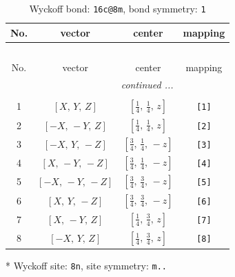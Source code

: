 \documentclass[fleqn,8pt]{jsarticle}
\begin{document}
\renewcommand{\arraystretch}{1.2}
\begin{longtable}{cccc}
\caption{Wyckoff bond: {\tt 16c@8m}, bond symmetry: {\tt 1}}
 \\
 \hline \hline
No. & vector & center & mapping \\ \hline \endfirsthead

\multicolumn{3}{l}{\tablename\ \thetable{}} \\
 \hline \hline
No. & vector & center & mapping \\ \hline \endhead

 \hline \hline
\multicolumn{3}{r}{\footnotesize\it continued ...} \\ \endfoot

 \hline \hline
\multicolumn{3}{r}{} \\ \endlastfoot

1 & $\left[ X,\, Y,\, Z \right]$ & $\left[ \frac{1}{4},\, \frac{1}{4},\, z \right]$ & {\tt [1]} \\ \hline
2 & $\left[ - X,\, - Y,\, Z \right]$ & $\left[ \frac{1}{4},\, \frac{1}{4},\, z \right]$ & {\tt [2]} \\ \hline
3 & $\left[ - X,\, Y,\, - Z \right]$ & $\left[ \frac{3}{4},\, \frac{1}{4},\, - z \right]$ & {\tt [3]} \\ \hline
4 & $\left[ X,\, - Y,\, - Z \right]$ & $\left[ \frac{3}{4},\, \frac{1}{4},\, - z \right]$ & {\tt [4]} \\ \hline
5 & $\left[ - X,\, - Y,\, - Z \right]$ & $\left[ \frac{3}{4},\, \frac{3}{4},\, - z \right]$ & {\tt [5]} \\ \hline
6 & $\left[ X,\, Y,\, - Z \right]$ & $\left[ \frac{3}{4},\, \frac{3}{4},\, - z \right]$ & {\tt [6]} \\ \hline
7 & $\left[ X,\, - Y,\, Z \right]$ & $\left[ \frac{1}{4},\, \frac{3}{4},\, z \right]$ & {\tt [7]} \\ \hline
8 & $\left[ - X,\, Y,\, Z \right]$ & $\left[ \frac{1}{4},\, \frac{3}{4},\, z \right]$ & {\tt [8]} \\
\end{longtable}
* Wyckoff site: {\tt 8n}, site symmetry: {\tt m..}
\renewcommand{\arraystretch}{1.2}
\end{document}
